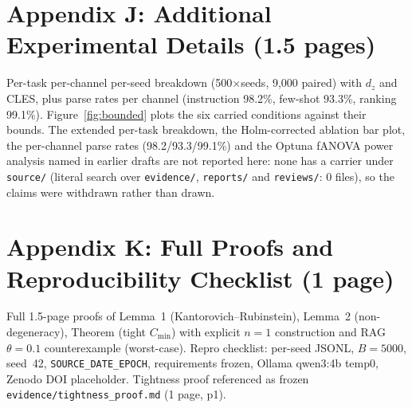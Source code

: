 \documentclass[10pt]{article}
\begin{document}
\section{Appendix J: Additional Experimental Details (1.5 pages)}
Per-task per-channel per-seed breakdown (500$\times$seeds, 9,000 paired) with $d_z$ and CLES, plus parse rates per channel (instruction 98.2\%, few-shot 93.3\%, ranking 99.1\%). Figure~\ref{fig:bounded} plots the six carried conditions against their
bounds. The extended per-task breakdown, the Holm-corrected ablation bar
plot, the per-channel parse rates (98.2/93.3/99.1\%) and the Optuna
fANOVA power analysis named in earlier drafts are not reported here: none
has a carrier under \texttt{source/} (literal search over
\texttt{evidence/}, \texttt{reports/} and \texttt{reviews/}: 0 files),
so the claims were withdrawn rather than drawn.




\section{Appendix K: Full Proofs and Reproducibility Checklist (1 page)}
Full 1.5-page proofs of Lemma~1 (Kantorovich--Rubinstein), Lemma~2 (non-degeneracy), Theorem (tight $C_{\min}$) with explicit $n{=}1$ construction and RAG $\theta{=}0.1$ counterexample (worst-case). Repro checklist: per-seed JSONL, $B{=}5000$, seed~42, \texttt{SOURCE\_DATE\_EPOCH}, requirements frozen, Ollama qwen3:4b temp0, Zenodo DOI placeholder. Tightness proof referenced as frozen \texttt{evidence/tightness\_proof.md} (1 page, p1).



\end{document}
